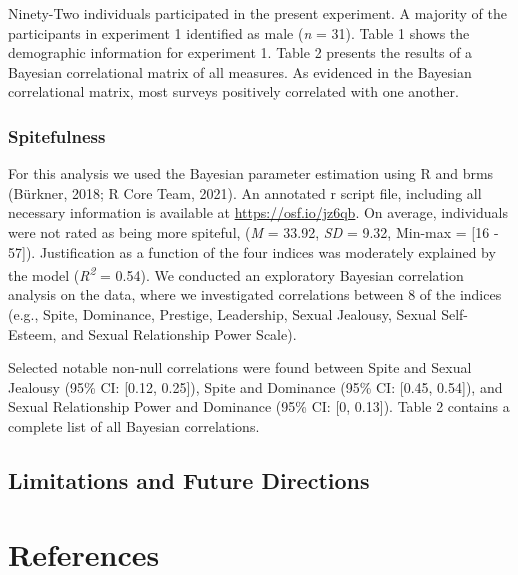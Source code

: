 \documentclass[
  english,
  a4paper,floatsintext]{apa7}
\begin{document}
Ninety-Two individuals participated in the present experiment. A majority of the participants in experiment 1 identified as male (\emph{n} = 31). Table 1 shows the demographic information for experiment 1. Table 2 presents the results of a Bayesian correlational matrix of all measures. As evidenced in the Bayesian correlational matrix, most surveys positively correlated with one another.

\hypertarget{spitefulness-1}{%
\subsubsection{Spitefulness}\label{spitefulness-1}}

For this analysis we used the Bayesian parameter estimation using R and brms (Bürkner, 2018; R Core Team, 2021). An annotated r script file, including all necessary information is available at \url{https://osf.io/jz6qb}. On average, individuals were not rated as being more spiteful, (\emph{M} = 33.92, \emph{SD} = 9.32, Min-max = {[}16 - 57{]}). Justification as a function of the four indices was moderately explained by the model (\emph{R\textsuperscript{2}} = 0.54). We conducted an exploratory Bayesian correlation analysis on the data, where we investigated correlations between 8 of the indices (e.g., Spite, Dominance, Prestige, Leadership, Sexual Jealousy, Sexual Self-Esteem, and Sexual Relationship Power Scale).

Selected notable non-null correlations were found between Spite and Sexual Jealousy (95\% CI: {[}0.12, 0.25{]}), Spite and Dominance (95\% CI: {[}0.45, 0.54{]}), and Sexual Relationship Power and Dominance (95\% CI: {[}0, 0.13{]}). Table 2 contains a complete list of all Bayesian correlations.

\hypertarget{limitations-and-future-directions}{%
\subsection{Limitations and Future Directions}\label{limitations-and-future-directions}}

\newpage

\hypertarget{references}{%
\section{References}\label{references}}

\begingroup
\setlength{\parindent}{-0.5in}
\setlength{\leftskip}{0.5in}
\end{document}
